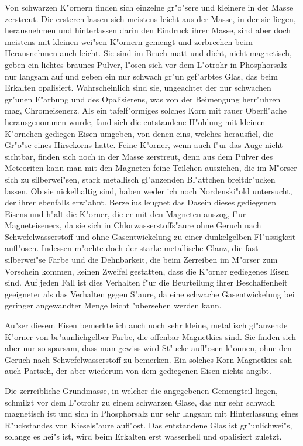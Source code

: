 \documentclass[a4paper, 11pt, oneside, german]{article}
\begin{document}
Von schwarzen K"ornern finden sich einzelne gr"o"sere und kleinere in der Masse zerstreut. Die ersteren lassen sich meistens leicht aus der Masse, in der sie liegen, herausnehmen und hinterlassen darin den Eindruck ihrer Masse, sind aber doch meistens mit kleinen wei"sen K"ornern gemengt und zerbrechen beim Herausnehmen auch leicht. Sie sind im Bruch matt und dicht, nicht magnetisch, geben ein lichtes braunes Pulver, l"osen sich vor dem L"otrohr in Phosphorsalz nur langsam auf und geben ein nur schwach gr"un gef"arbtes Glas, das beim Erkalten opalisiert. Wahrscheinlich sind sie, ungeachtet der nur schwachen gr"unen F"arbung und des Opalisierens, was von der Beimengung herr"uhren mag, Chromeisenerz. Als ein tafelf"ormiges solches Korn mit rauer Oberfl"ache herausgenommen wurde, fand sich die entstandene H"ohlung mit kleinen K"ornchen gediegen Eisen umgeben, von denen eins, welches herausfiel, die Gr"o"se eines Hirsekorns hatte. Feine K"orner, wenn auch f"ur das Auge nicht sichtbar, finden sich noch in der Masse zerstreut, denn aus dem Pulver des Meteoriten kann man mit den Magneten feine Teilchen ausziehen, die im M"orser sich zu silberwei"sen, stark metallisch gl"anzenden Bl"attchen breitdr"ucken lassen. Ob sie nickelhaltig sind, haben weder ich noch Nordenski"old untersucht, der ihrer ebenfalls erw"ahnt. Berzelius leugnet das Dasein dieses gediegenen Eisens und h"alt die K"orner, die er mit den Magneten auszog, f"ur Magneteisenerz, da sie sich in Chlorwasserstoffs"aure ohne Geruch nach Schwefelwasserstoff und ohne Gasentwickelung zu einer dunkelgelben Fl"ussigkeit aufl"osen. Indessen m"ochte doch der starke metallische Glanz, die fast silberwei"se Farbe und die Dehnbarkeit, die beim Zerreiben im M"orser zum Vorschein kommen, keinen Zweifel gestatten, dass die K"orner gediegenes Eisen sind. Auf jeden Fall ist dies Verhalten f"ur die Beurteilung ihrer Beschaffenheit geeigneter als das Verhalten gegen S"aure, da eine schwache Gasentwickelung bei geringer angewandter Menge leicht "ubersehen werden kann.

Au"ser diesem Eisen bemerkte ich auch noch sehr kleine, metallisch gl"anzende K"orner von br"aunlichgelber Farbe, die offenbar Magnetkies sind. Sie finden sich aber nur so sparsam, dass man gewiss wird St"ucke aufl"osen k"onnen, ohne den Geruch nach Schwefelwasserstoff zu bemerken. Ein solches Korn Magnetkies sah auch Partsch, der aber wiederum von dem gediegenen Eisen nichts angibt.

Die zerreibliche Grundmasse, in welcher die angegebenen Gemengteil liegen, schmilzt vor dem L"otrohr zu einem schwarzen Glase, das nur sehr schwach magnetisch ist und sich in Phosphorsalz nur sehr langsam mit Hinterlassung eines R"uckstandes von Kiesels"aure aufl"ost. Das entstandene Glas ist gr"unlichwei"s, solange es hei"s ist, wird beim Erkalten erst wasserhell und opalisiert zuletzt.
\end{document}

